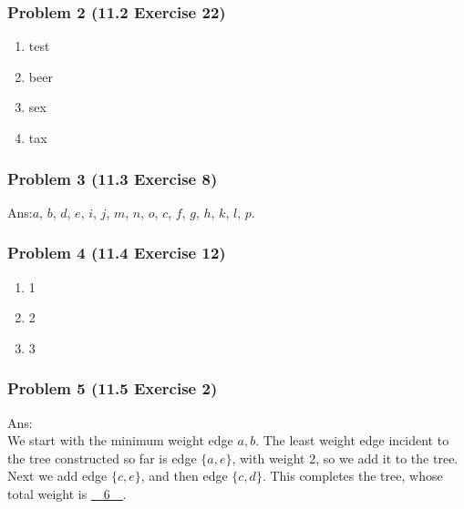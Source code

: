 \documentclass[12pt,hyperref={bookmarks=false}]{beamer}
\begin{document}
	\begin{frame}
	\frametitle{Problem 2 (11.2 Exercise 22)}
	\fontsize{12}{16pt}\selectfont
	\begin{enumerate}[label=(\alph*)]
	\setlength\itemsep{0em}
	\item test
	\item beer
	\item sex
	\item tax
	\end{enumerate}
	\end{frame}
	

	\begin{frame}
	\frametitle{Problem 3 (11.3 Exercise 8)}
	\fontsize{12}{16pt}\selectfont
	Ans:$a$, $b$, $d$, $e$, $i$, $j$, $m$, $n$, $o$, $c$, $f$, $g$, $h$, $k$, $l$, $p$.
	\end{frame}

	\begin{frame}
	\frametitle{Problem 4 (11.4 Exercise 12)}
	\fontsize{10}{10pt}\selectfont
	\begin{enumerate}[label=(\alph*)]
	\setlength\itemsep{0em}
	\item 1
	\item 2
	\item 3
	\end{enumerate}
	\end{frame}
	
	\begin{frame}
	\frametitle{Problem 5 (11.5 Exercise 2)}
	\fontsize{10}{10pt}\selectfont

	\vspace*{0.3cm}
	Ans: \\
	We start with the minimum weight edge ${a, b}$. The least weight edge incident to the tree constructed so far is edge $\{a, e\}$, with weight 2, so we add it to the tree. Next we add edge $\{c, e\}$, and then edge $\{c, d\}$. This completes the tree, whose total weight is \underline{~~6~~}.
	\end{frame}
	


		
\end{document}

